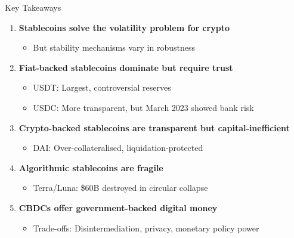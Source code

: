 \documentclass[10pt]{beamer}
\begin{document}
\begin{frame}{Key Takeaways}
  \begin{enumerate}
    \item \textbf{Stablecoins solve the volatility problem for crypto}
    \begin{itemize}
      \item But stability mechanisms vary in robustness
    \end{itemize}
    
    \vspace{0.3em}
    \item \textbf{Fiat-backed stablecoins dominate but require trust}
    \begin{itemize}
      \item USDT: Largest, controversial reserves
      \item USDC: More transparent, but March 2023 showed bank risk
    \end{itemize}
    
    \vspace{0.3em}
    \item \textbf{Crypto-backed stablecoins are transparent but capital-inefficient}
    \begin{itemize}
      \item DAI: Over-collateralised, liquidation-protected
    \end{itemize}
    
    \vspace{0.3em}
    \item \textbf{Algorithmic stablecoins are fragile}
    \begin{itemize}
      \item Terra/Luna: \$60B destroyed in circular collapse
    \end{itemize}
    
    \vspace{0.3em}
    \item \textbf{CBDCs offer government-backed digital money}
    \begin{itemize}
      \item Trade-offs: Disintermediation, privacy, monetary policy power
    \end{itemize}
  \end{enumerate}
\end{frame}
\end{document}
